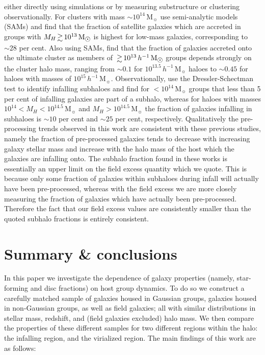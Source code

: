 \documentclass[a4paper,fleqn,usenatbib]{mnras}
\newcommand{\Msun}{\,\mathrm{M_{\sun}}}
\begin{document}
either directly using simulations or by measuring substructure or
clustering observationally.  For clusters with mass $\sim
10^{14}\Msun$ \citet{delucia2012} use semi-analytic models (SAMs) and find
that the fraction of satellite galaxies which are accreted in groups
with $M_H \ga 10^{13}\Msun$ is highest for low-mass galaxies,
corresponding to $\sim 28$ per cent.  Also using SAMs,
\citet{mcgee2009} find that the fraction of galaxies accreted onto the
ultimate cluster as members of $\ga 10^{13}\,h^{-1}\Msun$ groups depends
strongly on the cluster halo mass, ranging from $\sim 0.1$ for
$10^{13.5}\,h^{-1}\Msun$ haloes to $\sim 0.45$ for haloes with masses
of $10^{15}\,h^{-1}\Msun$.  Observationally, \citet{hou2014} use the
Dressler-Schectman test \citep{dressler1988} to identify infalling
subhaloes and find for $<10^{14}\Msun$ groups that less than 5 per
cent of infalling galaxies are part of a subhalo, whereas for haloes
with masses $10^{14} < M_H < 10^{14.5}\Msun$ and $M_H >
10^{14.5}\Msun$ the fraction of galaxies infalling in subhaloes is
$\sim 10$ per cent and $\sim 25$ per cent, respectively.
Qualitatively the pre-processing trends observed in this work are
consistent with these previous studies, namely the fraction of
pre-processed galaxies tends to decrease with increasing galaxy stellar mass and
increase with the halo mass of the host which the galaxies are
infalling onto.  The subhalo fraction found in these works is
essentially an upper limit on the field excess quantity which we
quote.  This is because only some fraction of galaxies within subhaloes
during infall will actually have been pre-processed, whereas with the
field excess we are more closely measuring the fraction of galaxies
which have actually been pre-processed.  Therefore the fact that our
field excess values are consistently smaller than the quoted subhalo
fractions is entirely consistent.


\section{Summary \& conclusions}
\label{sec:summary}

In this paper we investigate the dependence of galaxy properties
(namely, star-forming and disc fractions) on host group dynamics.  To
do so we construct a carefully matched sample of galaxies housed in
Gaussian groups, galaxies housed in non-Gaussian groups, as well as
field galaxies; all with similar distributions in stellar mass,
redshift, and (field galaxies excluded) halo mass.  We then compare
the properties of these different samples for two different regions
within the halo: the infalling region, and the virialized region.  The
main findings of this work are as follows:
\end{document}
